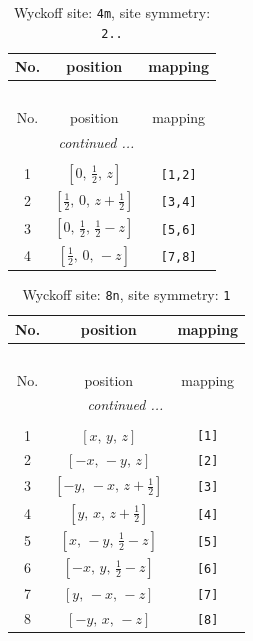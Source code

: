 \documentclass[fleqn,8pt]{jsarticle}
\begin{document}
\renewcommand{\arraystretch}{1.2}
\begin{longtable}{ccc}
\caption{Wyckoff site: {\tt 4m}, site symmetry: {\tt 2..}}
 \\
 \hline \hline
No. & position & mapping \\ \hline \endfirsthead

\multicolumn{2}{l}{\tablename\ \thetable{}} \\
 \hline \hline
No. & position & mapping \\ \hline \endhead

 \hline \hline
\multicolumn{2}{r}{\footnotesize\it continued ...} \\ \endfoot

 \hline \hline
\multicolumn{2}{r}{} \\ \endlastfoot

1 & $\left[ 0,\, \frac{1}{2},\, z \right]$ & {\tt [1,2]} \\ \hline
2 & $\left[ \frac{1}{2},\, 0,\, z + \frac{1}{2} \right]$ & {\tt [3,4]} \\ \hline
3 & $\left[ 0,\, \frac{1}{2},\, \frac{1}{2} - z \right]$ & {\tt [5,6]} \\ \hline
4 & $\left[ \frac{1}{2},\, 0,\, - z \right]$ & {\tt [7,8]} \\
\end{longtable}
\renewcommand{\arraystretch}{1.2}
\begin{longtable}{ccc}
\caption{Wyckoff site: {\tt 8n}, site symmetry: {\tt 1}}
 \\
 \hline \hline
No. & position & mapping \\ \hline \endfirsthead

\multicolumn{2}{l}{\tablename\ \thetable{}} \\
 \hline \hline
No. & position & mapping \\ \hline \endhead

 \hline \hline
\multicolumn{2}{r}{\footnotesize\it continued ...} \\ \endfoot

 \hline \hline
\multicolumn{2}{r}{} \\ \endlastfoot

1 & $\left[ x,\, y,\, z \right]$ & {\tt [1]} \\ \hline
2 & $\left[ - x,\, - y,\, z \right]$ & {\tt [2]} \\ \hline
3 & $\left[ - y,\, - x,\, z + \frac{1}{2} \right]$ & {\tt [3]} \\ \hline
4 & $\left[ y,\, x,\, z + \frac{1}{2} \right]$ & {\tt [4]} \\ \hline
5 & $\left[ x,\, - y,\, \frac{1}{2} - z \right]$ & {\tt [5]} \\ \hline
6 & $\left[ - x,\, y,\, \frac{1}{2} - z \right]$ & {\tt [6]} \\ \hline
7 & $\left[ y,\, - x,\, - z \right]$ & {\tt [7]} \\ \hline
8 & $\left[ - y,\, x,\, - z \right]$ & {\tt [8]} \\
\end{longtable}
\end{document}
